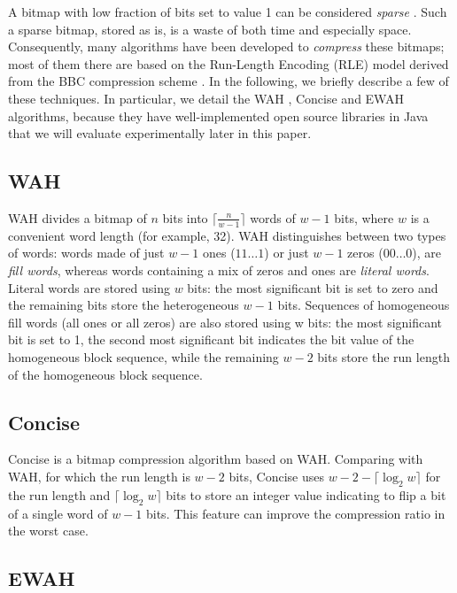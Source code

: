 A bitmap with low fraction of bits set to value 1 can be considered \emph{sparse} \cite{lemire2014}. Such a sparse bitmap, stored as is, is a waste of both time and especially space. Consequently, many algorithms have been developed to \emph{compress} these bitmaps; most of them there are based on the Run-Length Encoding (RLE) model derived from the BBC compression scheme \cite{antoshenkov1995byte}. In the following, we briefly describe a few of these techniques. In particular, we detail the WAH \cite{wu2006optimizing}, Concise \cite{colantonio2010} and EWAH\cite{lemire2010} algorithms, because they have well-implemented open source libraries in Java that we will evaluate experimentally later in this paper.

\subsection{WAH}

WAH \citep{wu2006optimizing} divides a bitmap of $n$ bits into $\lceil \frac{n}{w-1}\rceil$ words of $w -1$ bits, where $w$ is a convenient word length (for example, 32). WAH distinguishes between two types of words: words made of just $w-1$ ones ($11\dots 1$) or just $w-1$ zeros ($00\dots 0$), are \emph{fill words}, whereas words containing a mix of zeros and ones are \emph{literal words}. Literal words are stored using $w$ bits: the most significant bit is set to zero and the remaining bits store the heterogeneous $w-1$ bits. Sequences of homogeneous fill words (all ones or all zeros) are also stored using w bits: the most significant bit is set to 1, the second most significant bit indicates the bit value of the homogeneous block sequence, while the remaining $w-2$ bits store the run length of the homogeneous block sequence.

\subsection{Concise}

Concise \citep{colantonio2010} is a bitmap compression algorithm based on WAH. Comparing with WAH, for which the run length is $w-2$ bits, Concise uses $w - 2 - \lceil \log_2 w \rceil$ for the run length and $\lceil \log_2 w \rceil$ bits to store an integer value indicating to flip a bit of a single word of $w-1$ bits. This feature can improve the compression ratio in the worst case.

\subsection{EWAH}

